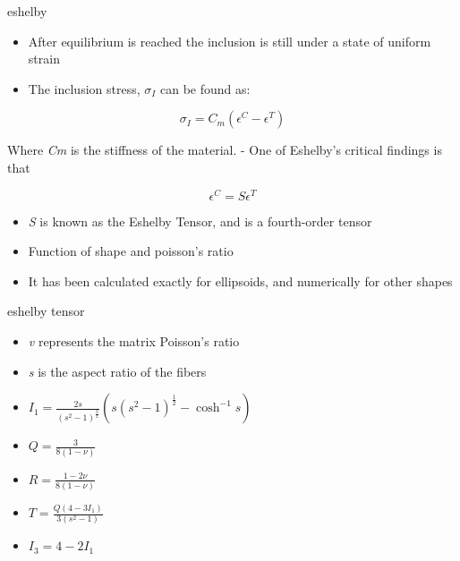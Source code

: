 \documentclass[
  letterpaper,
  ignorenonframetext,
  aspectratio=43,
  handout,
  12pt]{beamer}
\providecommand{\tightlist}{%
  \setlength{\itemsep}{0pt}\setlength{\parskip}{0pt}}
\providecommand{\tightlist}{%
\setlength{\itemsep}{0pt}\setlength{\parskip}{0pt}}
\begin{document}
\begin{frame}{eshelby}
\protect\hypertarget{eshelby-1}{}
\begin{itemize}
\tightlist
\item
  After equilibrium is reached the inclusion is still under a state of
  uniform strain
\item
  The inclusion stress, \(\sigma_I\) can be found as:
\end{itemize}

\[\sigma_I = C_m (\epsilon^C - \epsilon^T)\]

Where \emph{C}\emph{m} is the stiffness of the material. - One of
Eshelby's critical findings is that

\[\epsilon^C = S \epsilon^T\]

\begin{itemize}
\tightlist
\item
  \emph{S} is known as the Eshelby Tensor, and is a fourth-order tensor
\item
  Function of shape and poisson's ratio
\item
  It has been calculated exactly for ellipsoids, and numerically for
  other shapes
\end{itemize}
\end{frame}

\begin{frame}{eshelby tensor}
\protect\hypertarget{eshelby-tensor}{}
\begin{itemize}
\tightlist
\item
  \emph{v} represents the matrix Poisson's ratio
\item
  \emph{s} is the aspect ratio of the fibers
\item
  \(I_1 = \frac{2s}{\left(s^2-1\right)^{\frac{3}{2}}}(s{\left(s^2-1\right)}^{\frac{1}{2}}-\cosh^{-1} s)\)
\item
  \(Q=\frac{3}{8(1-\nu)}\)
\item
  \(R=\frac{1-2\nu}{8(1-\nu)}\)
\item
  \(T=\frac{Q\left(4-3I_1\right)}{3(s^2-1)}\)
\item
  \(I_3 = 4-2I_1\)
\end{itemize}
\end{frame}
\end{document}
